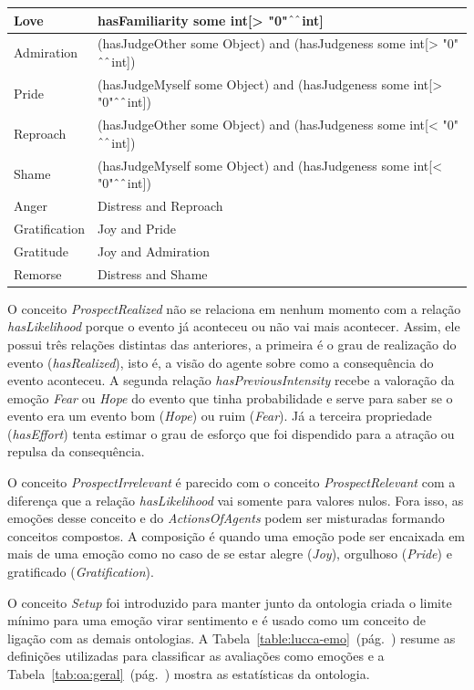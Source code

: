 \begin{table}[pt]
\begin{center}
\begin{tabular}{|p{20mm}|p{120mm}|}
		Love & hasFamiliarity some int[> "0"$\UP\UP$int]\\ \hline
		Admiration & (hasJudgeOther some Object) and (hasJudgeness some int[> "0"$\UP\UP$int])\\ \hline
		Pride & (hasJudgeMyself some Object) and (hasJudgeness some int[> "0"$\UP\UP$int])\\ \hline
		Reproach & (hasJudgeOther some Object) and (hasJudgeness some int[< "0"$\UP\UP$int])\\ \hline
		Shame & (hasJudgeMyself some Object) and (hasJudgeness some int[< "0"$\UP\UP$int])\\ \hline
		Anger & Distress and Reproach \\ \hline
		Gratification &  Joy and Pride \\ \hline
		Gratitude & Joy and Admiration \\ \hline
		Remorse & Distress and Shame \\ \hline
	\end{tabular}
	\end{center}
\end{table}

O conceito \emph{ProspectRealized} não se relaciona em nenhum momento com a
relação \emph{hasLikelihood} porque o evento já aconteceu ou não vai mais
acontecer. Assim, ele possui três relações distintas das anteriores, a
primeira é o grau de realização do evento (\emph{hasRealized}), isto é, a
visão do agente sobre como a consequência do evento aconteceu. A segunda
relação \emph{hasPreviousIntensity} recebe a valoração da emoção \emph{Fear}
ou \emph{Hope} do evento que tinha probabilidade e serve para saber se o evento era
um evento bom (\emph{Hope}) ou ruim (\emph{Fear}). Já a terceira propriedade
(\emph{hasEffort}) tenta estimar o grau de esforço que foi dispendido para a
atração ou repulsa da consequência.

O conceito \emph{ProspectIrrelevant} é parecido com o conceito
\emph{ProspectRelevant} com a diferença que a relação \emph{hasLikelihood} vai
somente para valores nulos. Fora isso, as emoções desse conceito e do
\emph{ActionsOfAgents} podem ser misturadas formando conceitos compostos.
A composição é quando uma emoção pode ser encaixada em mais de uma emoção
como no caso de se estar alegre (\emph{Joy}), orgulhoso (\emph{Pride}) e
gratificado (\emph{Gratification}).

O conceito \emph{Setup} foi introduzido para manter junto da ontologia criada
o limite mínimo para uma emoção virar sentimento\dev{} e é
usado como um conceito de ligação com as demais ontologias.  A
Tabela~\ref{table:lucca-emo}~(pág.~\pageref{table:lucca-emo}) resume as
definições utilizadas para classificar as avaliações como emoções e a
Tabela~\ref{tab:oa:geral}~(pág.~\pageref{tab:oa:geral}) mostra as estatísticas
da ontologia.

